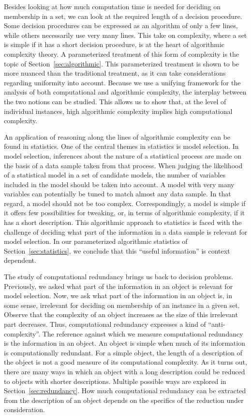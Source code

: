 Besides looking at how much computation time is needed for deciding on membership in a set, we can look at the required length of a decision procedure.
Some decision procedures can be expressed as an algorithm of only a few lines, while others necessarily use very many lines.
This take on complexity, where a set is simple if it has a short decision procedure, is at the heart of algorithmic complexity theory.
A parameterized treatment of this form of complexity is the topic of Section~\ref{sec:algorithmic}.
This parameterized treatment is shown to be more nuanced than the traditional treatment, as it can take considerations regarding uniformity into account.
Because we use a unifying framework for the analysis of both computational and algorithmic complexity, the interplay between the two notions can be studied.
This allows us to show that, at the level of individual instances, high algorithmic complexity implies high computational complexity.

An application of reasoning along the lines of algorithmic complexity can be found in statistics.
One of the central themes in statistics is model selection.
In model selection, inferences about the nature of a statistical process are made on the basis of a data sample taken from that process.
When judging the likelihood of a statistical model in a set of candidate models, the number of variables included in the model should be taken into account.
A model with very many variables can potentially be tuned to match almost any data sample.
In that regard, a model should not be too complex.
Correspondingly, a model is simple if it offers few possibilities for tweaking, or, in terms of algorithmic complexity, if it has a short description.
This algorithmic approach to statistics is faced with the challenge of deciding what part of the information in a data sample is relevant for model selection.
In our parameterized algorithmic statistics of Section~\ref{sec:statistics}, we conclude that this \enquote{useful information} is context dependent.

The study of computational redundancy brings us back to decision problems.
Previously, we asked what part of the information in an object is relevant for model selection.
Now, we ask what part of the information in an object is, in some sense, irrelevant for deciding on membership of an instance in a given set.
Observe that the complexity of an object increases as the size of this irrelevant part decreases.
Thus, computational redundancy expresses a kind of \enquote{anti-complexity}.
The reference against which we measure computational redundancy is the information in an object.
An object is simple when much of its information is computationally redundant.
For a simple object, the length of a description of the object is not a good measure of its computational complexity.
As it turns out, there are many ways in which an object with a long description could be reduced to objects with shorter descriptions.
Multiple possible ways are explored in Section~\ref{sec:redundancy}.
How much computational redundancy can be extracted from the description of an object depends on the specifics of the reduction under consideration.

